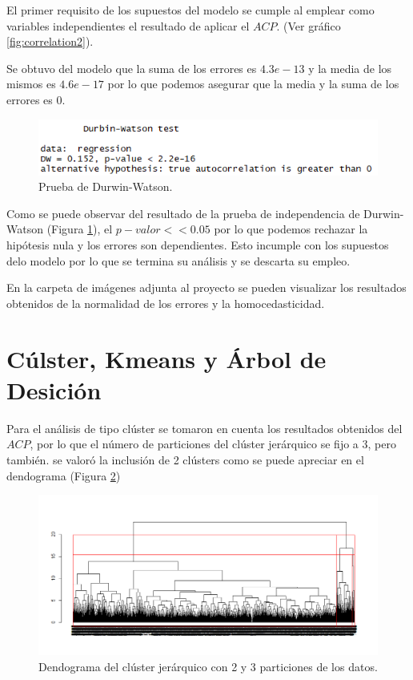 \documentclass[a4paper,10pt,twocolumn]{article}
\begin{document}
  El primer requisito de los supuestos del modelo se cumple al emplear como variables independientes el resultado de aplicar el $ACP$. (Ver gráfico \ref{fig:correlation2}).
  
  Se obtuvo del modelo que la suma de los errores es $4.3e-13$ y la media de los mismos es $4.6e-17$ por lo que podemos asegurar que la media y la suma de los errores es 0.
  
  \begin{figure}[htb]%
  	\begin{center}
  		\includegraphics[width=\linewidth]{Images/dwtest.png}
  	\end{center}
  	\caption{Prueba de Durwin-Watson.}
  	\label{fig:dwtest}
  \end{figure}
  
  Como se puede observar del resultado de la prueba de independencia de Durwin-Watson (Figura \ref{fig:dwtest}), el $p-valor << 0.05$ por lo que podemos rechazar la hipótesis nula y los errores son dependientes. Esto incumple con los supuestos delo modelo por lo que se termina su análisis y se descarta su empleo.
  
  En la carpeta de imágenes adjunta al proyecto se pueden visualizar los resultados obtenidos de la normalidad de los errores y la homocedasticidad.
  
\section{Cúlster, Kmeans y Árbol de Desición}
  
  Para el análisis de tipo clúster se tomaron en cuenta los resultados obtenidos del $ACP$, por lo que el número de particiones del clúster jerárquico se fijo a 3, pero también. se valoró la inclusión de 2 clústers como se puede apreciar en el dendograma (Figura \ref{fig:cluster1})
  
  \begin{figure}[htb]%
  	\begin{center}
  		\includegraphics[width=\linewidth]{Images/cluster2.png}
  	\end{center}
  	\caption{Dendograma del clúster jerárquico con 2 y 3 particiones de los datos.}
  	\label{fig:cluster1}
  \end{figure}
  
\end{document}
